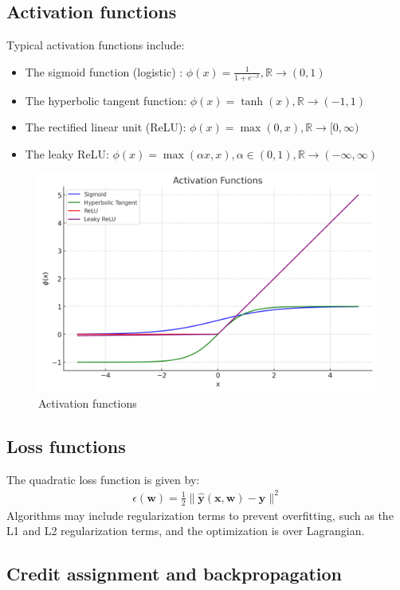 \documentclass[11pt]{book} %
\begin{document}
\subsection{Activation functions}
Typical activation functions include:
\begin{itemize}
    \item The sigmoid function (logistic) : $\phi(x) = \frac{1}{1 + e^{-x}}, \mathbb{R} \rightarrow (0, 1)$
    \item The hyperbolic tangent function: $\phi(x) = \tanh(x) , \mathbb{R} \rightarrow (-1, 1)$
    \item The rectified linear unit (ReLU): $\phi(x) = \max(0, x) , \mathbb{R} \rightarrow [0, \infty)$
    \item The leaky ReLU: $\phi(x) = \max(\alpha x, x), \alpha \in (0, 1), \mathbb{R} \rightarrow (-\infty, \infty)$
\end{itemize}

\begin{figure}
    \centering
    \includegraphics[width=0.6\linewidth]{Figs/activation_functions.png}
    \caption{Activation functions}
\label{fig:activation_functions}
\end{figure}


\subsection{Loss functions}
The quadratic loss function is given by:
\begin{align*}
    \epsilon(\mathbf{w}) = \frac{1}{2} \lVert \hat{\mathbf{y}}(\mathbf{x}, \mathbf{w}) - \mathbf{y} \rVert^2
\end{align*}
Algorithms may include regularization terms to prevent overfitting, such as the L1 and L2 regularization terms, and the optimization is over Lagrangian.

\subsection{Credit assignment and backpropagation}
\end{document}
